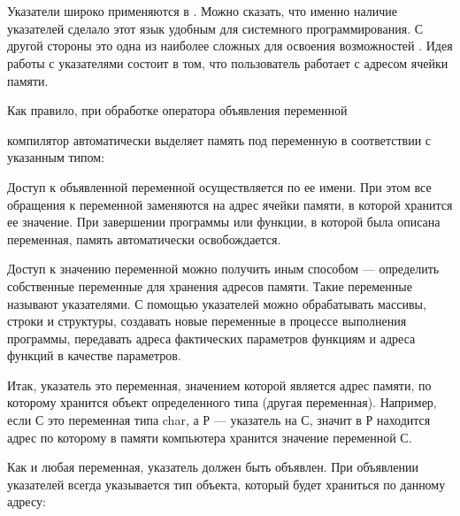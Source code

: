 




\section[Указатели]{}
Указатели широко применяются в . Можно сказать, что именно наличие указателей сделало этот язык
удобным для системного программирования. С другой стороны это одна из наиболее сложных для освоения возможностей .
Идея работы с указателями состоит в том, что пользователь работает с адресом ячейки памяти.

Как правило, при обработке оператора объявления переменной 


компилятор автоматически выделяет память под переменную
 в соответствии с указанным типом:


Доступ к объявленной переменной осуществляется по ее имени. При
этом все обращения к переменной заменяются на адрес ячейки памяти, в которой хранится ее значение. При завершении
программы или функции, в которой была описана переменная, память автоматически освобождается.

Доступ к значению переменной можно получить иным способом --- определить собственные
переменные для хранения адресов памяти. Такие переменные называют
указателями. С помощью указателей можно обрабатывать массивы,
строки и структуры, создавать новые переменные в процессе выполнения программы, передавать адреса фактических
параметров функциям и адреса функций в качестве параметров.

Итак, указатель это переменная, значением которой является
адрес памяти, по которому хранится объект определенного типа (другая переменная). Например, если
С это переменная типа
char, а Р --- указатель на
С, значит в Р находится адрес по которому в
памяти компьютера хранится значение переменной С.

Как и любая переменная, указатель должен быть объявлен. При
объявлении указателей всегда указывается тип объекта, который будет храниться по данному адресу:


